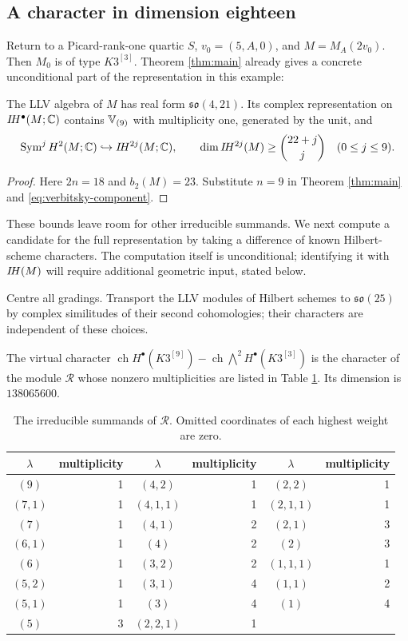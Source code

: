 \subsection{A character in dimension eighteen}
Return to a Picard-rank-one quartic $S$, $v_0=(5,A,0)$,
and $M=M_A(2v_0)$. Then $M_0$ is of type $K3^{[3]}$.
Theorem \ref{thm:main} already gives a concrete unconditional
part of the representation in this example:
\begin{corollary}\label{cor:eighteen-unconditional}
The LLV algebra of $M$ has real form $\mathfrak{so}(4,21)$.
Its complex representation on $I\!H^\bullet(M;\mathbb C)$ contains
$\mathbb V_{(9)}$ with multiplicity one, generated by the unit, and
\[
 \operatorname{Sym}^jH^2(M;\mathbb C)\hookrightarrow I\!H^{2j}(M;\mathbb C),
 \qquad \dim I\!H^{2j}(M)\ge\binom{22+j}{j}\quad(0\le j\le9).
\]
\end{corollary}
\begin{proof}
Here $2n=18$ and $b_2(M)=23$. Substitute $n=9$ in
Theorem \ref{thm:main} and \eqref{eq:verbitsky-component}.
\end{proof}

These bounds leave room for other irreducible summands. We next
compute a candidate for the full representation by taking a
difference of known Hilbert-scheme characters. The computation
itself is unconditional; identifying it with $I\!H(M)$ will
require additional geometric input, stated below.

Centre all gradings. Transport the LLV modules of Hilbert
schemes to $\mathfrak{so}(25)$ by complex similitudes of
their second cohomologies; their characters are independent
of these choices.

\begin{lemma}\label{lem:character}
The virtual character
$\operatorname{ch}H^\bullet(K3^{[9]})-
\operatorname{ch}\bigwedge^2H^\bullet(K3^{[3]})$
is the character of the module $\mathcal R$ whose nonzero
multiplicities are listed in Table \ref{tab:representation}.
Its dimension is $138065600$.
\end{lemma}

\begin{table}[ht]
\centering
\caption{The irreducible summands of $\mathcal R$. Omitted
coordinates of each highest weight are zero.}
\label{tab:representation}
\begin{tabular}{crcrcr}
\toprule
$\lambda$&multiplicity&$\lambda$&multiplicity&$\lambda$&multiplicity\\
\midrule
$(9)$&1&$(4,2)$&1&$(2,2)$&1\\
$(7,1)$&1&$(4,1,1)$&1&$(2,1,1)$&1\\
$(7)$&1&$(4,1)$&2&$(2,1)$&3\\
$(6,1)$&1&$(4)$&2&$(2)$&3\\
$(6)$&1&$(3,2)$&2&$(1,1,1)$&1\\
$(5,2)$&1&$(3,1)$&4&$(1,1)$&2\\
$(5,1)$&1&$(3)$&4&$(1)$&4\\
$(5)$&3&$(2,2,1)$&1&&\\
\bottomrule
\end{tabular}
\end{table}

